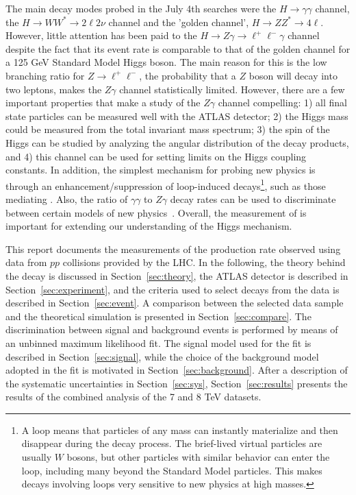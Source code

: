 The main decay modes probed in the July 4th searches were
the $H \to \gamma\gamma$ channel, the $H \to WW^* \to 2\ell2\nu$ channel 
and the 'golden channel', $H \to ZZ^* \to 4\ell$. 
However, little attention has been paid to the 
$H \to Z\gamma \to \ell^+\ell^-\gamma$ channel
despite the fact that its event rate is comparable to that of the golden  
channel for a 125 GeV Standard Model Higgs boson. The main reason for this is 
the low branching ratio for $Z \to \ell^+\ell^-$, the
probability that a $Z$ boson will decay into two leptons, 
makes the $Z\gamma$ channel statistically limited. 
However, there are a few important properties that make a study of the 
$Z\gamma$ channel compelling: 
1) all final state particles can be measured well with the ATLAS detector;  
2) the Higgs mass could be measured from the total invariant mass spectrum; 
3) the spin of the Higgs can be studied by analyzing the angular distribution 
of the decay products, and 
4) this channel can be used for setting limits on the Higgs coupling constants.
In addition, the simplest mechanism for probing new physics is through 
an enhancement/suppression of loop-induced decays\footnote{
A loop means that particles of any mass can instantly materialize and 
then disappear during the decay process. The brief-lived virtual particles
are usually $W$ bosons, but other particles with similar behavior can enter
the loop, including many beyond the Standard Model particles. This makes decays 
involving loops very sensitive to new physics at high masses.},
such as those mediating \HToZg. Also,
the ratio of $\gamma\gamma$ to $Z\gamma$ decay rates can
be used to discriminate between certain models of 
new physics~\cite{Zg_newPhy_1,Zg_newPhy_2, Zg_newPhy_3}.
Overall, the measurement of \HToZg is important for extending our understanding
of the Higgs mechanism.

This report documents the measurements of the \HToZg production rate observed
using data from $pp$ collisions provided by the LHC. In the following, the
theory behind the \HToZg decay is discussed in Section~\ref{sec:theory},
the ATLAS detector is described in Section~\ref{sec:experiment}, and the
criteria used to select \HToZg decays from the data is described in 
Section~\ref{sec:event}. A comparison between the selected data sample and
the theoretical simulation is presented in 
Section~\ref{sec:compare}. The discrimination between signal and background 
events is performed by means of an unbinned maximum likelihood fit.
The signal model used for the fit is described
in Section~\ref{sec:signal}, while the choice of the background model adopted
in the fit is motivated in Section~\ref{sec:background}. After a description of
the systematic uncertainties in Section~\ref{sec:sys}, Section~\ref{sec:results}
presents the results of the combined analysis of the 7 and 8 TeV datasets.
